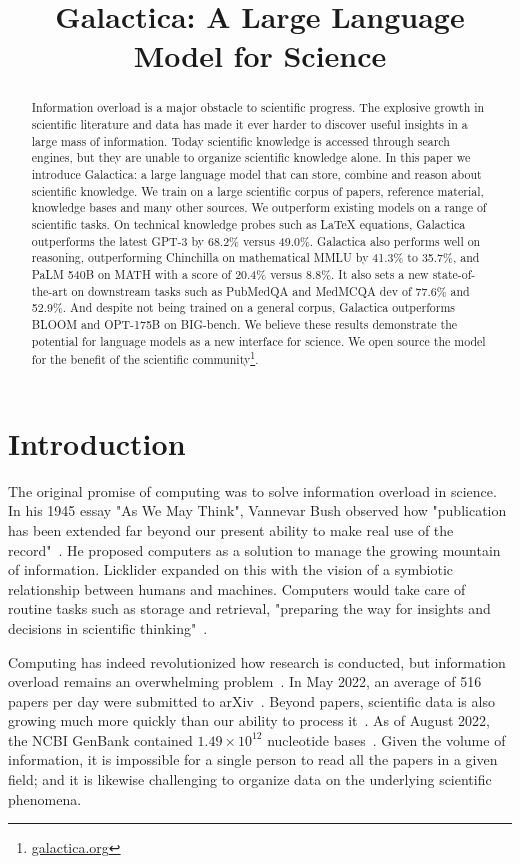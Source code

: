 \title{Galactica: A Large Language Model for Science}

\begin{abstract}
Information overload is a major obstacle to scientific progress. The explosive growth in scientific literature and data has made it ever harder to discover useful insights in a large mass of information. Today scientific knowledge is accessed through search engines, but they are unable to organize scientific knowledge alone. In this paper we introduce Galactica: a large language model that can store, combine and reason about scientific knowledge. We train on a large scientific corpus of papers, reference material, knowledge bases and many other sources. We outperform existing models on a range of scientific tasks. On technical knowledge probes such as LaTeX equations, Galactica outperforms the latest GPT-3 by 68.2\% versus 49.0\%. Galactica also performs well on reasoning, outperforming Chinchilla on mathematical MMLU by 41.3\% to 35.7\%, and PaLM 540B on MATH with a score of 20.4\% versus 8.8\%. It also sets a new state-of-the-art on downstream tasks such as PubMedQA and MedMCQA dev of 77.6\% and 52.9\%. And despite not being trained on a general corpus, Galactica outperforms BLOOM and OPT-175B on BIG-bench. We believe these results demonstrate the potential for language models as a new interface for science. We open source the model for the benefit of the scientific community\footnote{\url{galactica.org}}.
\end{abstract}

\section{Introduction}

The original promise of computing was to solve information overload in science. In his 1945 essay "As We May Think", Vannevar Bush observed how "publication has been extended far beyond our present ability to make real use of the record"~\citep{bush1945}. He proposed computers as a solution to manage the growing mountain of information. Licklider expanded on this with the vision of a symbiotic relationship between humans and machines. Computers would take care of routine tasks such as storage and retrieval, "preparing the way for insights and decisions in scientific thinking"~\citep{licklider1960}. 

Computing has indeed revolutionized how research is conducted, but information overload remains an overwhelming problem~\citep{GrowthRateScience}. In May 2022, an average of 516 papers per day were submitted to arXiv~\citep{arxivpapers}. Beyond papers, scientific data is also growing much more quickly than our ability to process it~\citep{BigChallengesBigData}. As of August 2022, the NCBI GenBank contained $1.49 \times 10^{12}$ nucleotide bases~\citep{genbank}. Given the volume of information, it is impossible for a single person to read all the papers in a given field; and it is likewise challenging to organize data on the underlying scientific phenomena.

